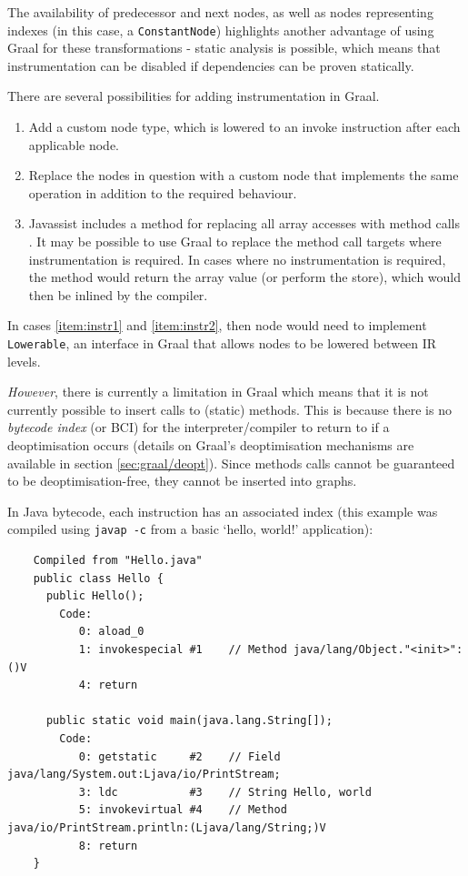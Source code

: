 	The availability of predecessor and next nodes, as well as nodes representing indexes (in this case, a \texttt{ConstantNode}) highlights another advantage of using Graal for these transformations - static analysis is possible, which means that instrumentation can be disabled if dependencies can be proven statically. 
	
	There are several possibilities for adding instrumentation in Graal.
	
	\begin{enumerate}
		\item \label{item:instr1} Add a custom node type, which is lowered to an invoke instruction after each applicable node.
	
		\item \label{item:instr2} Replace the nodes in question with a custom node that implements the same operation in addition to the required behaviour.
	
		\item \label{item:instr3} Javassist includes a method for replacing all array accesses with method calls \citep{JavassistDocs}. It may be possible to use Graal to replace the method call targets where instrumentation is required. In cases where no instrumentation is required, the method would return the array value (or perform the store), which would then be inlined by the compiler.
	\end{enumerate}
	
	In cases \ref{item:instr1} and \ref{item:instr2}, then node would need to implement \texttt{Lowerable}, an interface in Graal that allows nodes to be lowered between IR levels.
	
	\textit{However}, there is currently a limitation in Graal which means that it is not currently possible to insert calls to (static) methods. This is because there is no \emph{bytecode index} (or BCI) for the interpreter/compiler to return to if a deoptimisation occurs (details on Graal's deoptimisation mechanisms are available in section \ref{sec:graal/deopt}). Since methods calls cannot be guaranteed to be deoptimisation-free, they cannot be inserted into graphs.
	
	In Java bytecode, each instruction has an associated index (this example was compiled using \texttt{javap -c} from a basic `hello, world!' application):
	
	\begin{verbatim}
	Compiled from "Hello.java"
	public class Hello {
	  public Hello();
	    Code:
	       0: aload_0       
	       1: invokespecial #1    // Method java/lang/Object."<init>":()V
	       4: return        
	
	  public static void main(java.lang.String[]);
	    Code:
	       0: getstatic     #2    // Field java/lang/System.out:Ljava/io/PrintStream;
	       3: ldc           #3    // String Hello, world
	       5: invokevirtual #4    // Method java/io/PrintStream.println:(Ljava/lang/String;)V
	       8: return        
	}
	
	\end{verbatim}
	

